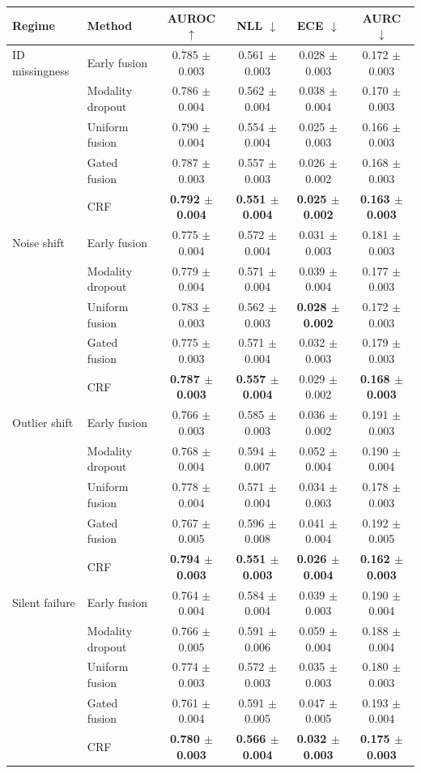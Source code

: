 \begin{tabular}{llcccc}
\toprule
Regime & Method & AUROC $\uparrow$ & NLL $\downarrow$ & ECE $\downarrow$ & AURC $\downarrow$ \\
\midrule
ID missingness & Early fusion & 0.785 $\pm$ 0.003 & 0.561 $\pm$ 0.003 & 0.028 $\pm$ 0.003 & 0.172 $\pm$ 0.003 \\
 & Modality dropout & 0.786 $\pm$ 0.004 & 0.562 $\pm$ 0.004 & 0.038 $\pm$ 0.004 & 0.170 $\pm$ 0.003 \\
 & Uniform fusion & 0.790 $\pm$ 0.004 & 0.554 $\pm$ 0.004 & 0.025 $\pm$ 0.003 & 0.166 $\pm$ 0.003 \\
 & Gated fusion & 0.787 $\pm$ 0.003 & 0.557 $\pm$ 0.003 & 0.026 $\pm$ 0.002 & 0.168 $\pm$ 0.003 \\
 & CRF & \textbf{0.792 $\pm$ 0.004} & \textbf{0.551 $\pm$ 0.004} & \textbf{0.025 $\pm$ 0.002} & \textbf{0.163 $\pm$ 0.003} \\
\addlinespace
Noise shift & Early fusion & 0.775 $\pm$ 0.004 & 0.572 $\pm$ 0.004 & 0.031 $\pm$ 0.003 & 0.181 $\pm$ 0.003 \\
 & Modality dropout & 0.779 $\pm$ 0.004 & 0.571 $\pm$ 0.004 & 0.039 $\pm$ 0.004 & 0.177 $\pm$ 0.003 \\
 & Uniform fusion & 0.783 $\pm$ 0.003 & 0.562 $\pm$ 0.003 & \textbf{0.028 $\pm$ 0.002} & 0.172 $\pm$ 0.003 \\
 & Gated fusion & 0.775 $\pm$ 0.003 & 0.571 $\pm$ 0.004 & 0.032 $\pm$ 0.003 & 0.179 $\pm$ 0.003 \\
 & CRF & \textbf{0.787 $\pm$ 0.003} & \textbf{0.557 $\pm$ 0.004} & 0.029 $\pm$ 0.002 & \textbf{0.168 $\pm$ 0.003} \\
\addlinespace
Outlier shift & Early fusion & 0.766 $\pm$ 0.003 & 0.585 $\pm$ 0.003 & 0.036 $\pm$ 0.002 & 0.191 $\pm$ 0.003 \\
 & Modality dropout & 0.768 $\pm$ 0.004 & 0.594 $\pm$ 0.007 & 0.052 $\pm$ 0.004 & 0.190 $\pm$ 0.004 \\
 & Uniform fusion & 0.778 $\pm$ 0.004 & 0.571 $\pm$ 0.004 & 0.034 $\pm$ 0.003 & 0.178 $\pm$ 0.003 \\
 & Gated fusion & 0.767 $\pm$ 0.005 & 0.596 $\pm$ 0.008 & 0.041 $\pm$ 0.004 & 0.192 $\pm$ 0.005 \\
 & CRF & \textbf{0.794 $\pm$ 0.003} & \textbf{0.551 $\pm$ 0.003} & \textbf{0.026 $\pm$ 0.004} & \textbf{0.162 $\pm$ 0.003} \\
\addlinespace
Silent failure & Early fusion & 0.764 $\pm$ 0.004 & 0.584 $\pm$ 0.004 & 0.039 $\pm$ 0.003 & 0.190 $\pm$ 0.004 \\
 & Modality dropout & 0.766 $\pm$ 0.005 & 0.591 $\pm$ 0.006 & 0.059 $\pm$ 0.004 & 0.188 $\pm$ 0.004 \\
 & Uniform fusion & 0.774 $\pm$ 0.003 & 0.572 $\pm$ 0.003 & 0.035 $\pm$ 0.003 & 0.180 $\pm$ 0.003 \\
 & Gated fusion & 0.761 $\pm$ 0.004 & 0.591 $\pm$ 0.005 & 0.047 $\pm$ 0.005 & 0.193 $\pm$ 0.004 \\
 & CRF & \textbf{0.780 $\pm$ 0.003} & \textbf{0.566 $\pm$ 0.004} & \textbf{0.032 $\pm$ 0.003} & \textbf{0.175 $\pm$ 0.003} \\
\bottomrule
\end{tabular}